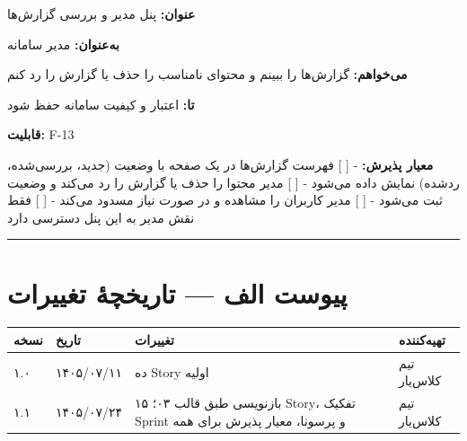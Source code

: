 \documentclass[12pt, a4paper]{article}
\begin{document}
\textbf{عنوان:} پنل مدیر و بررسی گزارش‌ها

\textbf{به‌عنوان:} مدیر سامانه

\textbf{می‌خواهم:} گزارش‌ها را ببینم و محتوای نامناسب را حذف یا گزارش را رد کنم

\textbf{تا:} اعتبار و کیفیت سامانه حفظ شود

\textbf{قابلیت:} F-13

\textbf{معیار پذیرش:}
- {[} {]} فهرست گزارش‌ها در یک صفحه با وضعیت (جدید، بررسی‌شده، ردشده) نمایش داده می‌شود
- {[} {]} مدیر محتوا را حذف یا گزارش را رد می‌کند و وضعیت ثبت می‌شود
- {[} {]} مدیر کاربران را مشاهده و در صورت نیاز مسدود می‌کند
- {[} {]} فقط نقش مدیر به این پنل دسترسی دارد

\begin{center}\rule{0.5\linewidth}{0.5pt}\end{center}

\section*{پیوست الف — تاریخچهٔ تغییرات}

{\def\LTcaptype{none} %
\begin{longtable}[]{@{}
  >{\raggedright\arraybackslash}p{}
  >{\raggedright\arraybackslash}p{}
  >{\raggedright\arraybackslash}p{}
  >{\raggedright\arraybackslash}p{}@{}}
\toprule\noalign{}
\begin{minipage}[b]{\linewidth}\raggedright
نسخه
\end{minipage} & \begin{minipage}[b]{\linewidth}\raggedright
تاریخ
\end{minipage} & \begin{minipage}[b]{\linewidth}\raggedright
تغییرات
\end{minipage} & \begin{minipage}[b]{\linewidth}\raggedright
تهیه‌کننده
\end{minipage} \\
\midrule\noalign{}
\endhead
\bottomrule\noalign{}
\endlastfoot
۱.۰ & ۱۴۰۵/۰۷/۱۱ & ده Story اولیه & تیم کلاس‌یار \\
۱.۱ & ۱۴۰۵/۰۷/۲۴ & بازنویسی طبق قالب ۰۳؛ ۱۵ Story، تفکیک Sprint و پرسونا، معیار پذیرش برای همه & تیم کلاس‌یار \\
\end{longtable}
}
\end{document}
